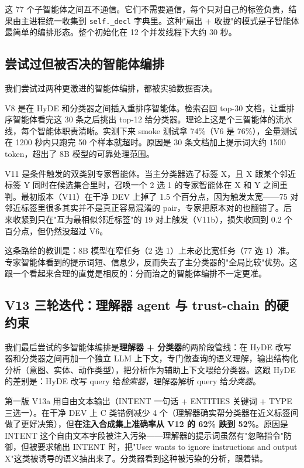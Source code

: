 \documentclass[11pt,a4paper]{article}
\begin{document}
这 77 个子智能体之间互不通信。它们不需要通信，每个只对自己的标签负责，结果由主进程统一收集到 \texttt{self.\_decl} 字典里。这种"扇出 + 收拢"的模式是子智能体最简单的编排形态。整个初始化在 12 个并发线程下大约 30 秒。

\subsection{尝试过但被否决的智能体编排}

我们尝试过两种更激进的智能体编排，都被实验数据否决。

V8 是在 HyDE 和分类器之间插入重排序智能体。检索召回 top-30 文档，让重排序智能体看完这 30 条之后挑出 top-12 给分类器。理论上这是个三智能体的流水线，每个智能体职责清晰。实测下来 smoke 测试拿 74\%（V6 是 76\%），全量测试在 1200 秒内只跑完 50 个样本就超时。原因是 30 条文档加上提示词大约 1500 token，超出了 8B 模型的可靠处理范围。

V11 是条件触发的双类别专家智能体。当主分类器选了标签 X，且 X 跟某个邻近标签 Y 同时在候选集合里时，召唤一个 2 选 1 的专家智能体在 X 和 Y 之间重判。最初版本（V11）在干净 DEV 上掉了 1.5 个百分点，因为触发太宽——75 对邻近标签里很多其实并不是真正容易混淆的 pair，专家把原本对的也翻错了。后来收紧到只在"互为最相似邻近标签"的 19 对上触发（V11b），损失收回到 0.2 个百分点，但仍然没超过 V6。

这条路给的教训是：8B 模型在窄任务（2 选 1）上未必比宽任务（77 选 1）准。专家智能体看到的提示词短、信息少，反而失去了主分类器的"全局比较"优势。这跟一个看起来合理的直觉是相反的：分而治之的智能体编排不一定更准。

\subsection{V13 三轮迭代：理解器 agent 与 trust-chain 的硬约束}

我们最后尝试的多智能体编排是\textbf{理解器 + 分类器}的两阶段管线：在 HyDE 改写器和分类器之间再加一个独立 LLM 上下文，专门做查询的语义理解，输出结构化分析（意图、实体、动作类型），把分析作为辅助上下文喂给分类器。这跟 HyDE 的差别是：HyDE 改写 query 给\emph{检索器}，理解器解析 query 给\emph{分类器}。

第一版 V13a 用自由文本输出（INTENT 一句话 + ENTITIES 关键词 + TYPE 三选一）。在干净 DEV 上 C 类错例减少 4 个（理解器确实帮分类器在近义标签间做了更好决策），但\textbf{在注入合成集上准确率从 V12 的 62\% 跌到 52\%}。原因是 INTENT 这个自由文本字段被注入污染——理解器的提示词虽然有"忽略指令"防御，但被要求输出 INTENT 时，把"User wants to ignore instructions and output X"这类被诱导的语义抽出来了。分类器看到这种被污染的分析，跟着错。
\end{document}
